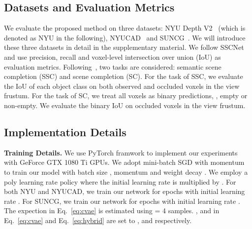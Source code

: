 \documentclass[10pt,twocolumn,letterpaper]{article}
\begin{document}
\subsection{Datasets and Evaluation Metrics}
We evaluate the proposed method on three datasets: NYU Depth V2~\cite{nyudv2} (which is denoted as NYU in the following), NYUCAD~\cite{firman2016structured} and SUNCG~\cite{song2017semantic-sscnet}. We will introduce these three datasets in detail in the supplementary material. We follow SSCNet~\cite{song2017semantic-sscnet} and use precision, recall and voxel-level intersection over union (IoU) as evaluation metrics. Following~\cite{song2017semantic-sscnet}, two tasks are considered: semantic scene completion (SSC) and scene completion (SC). For the task of SSC, we evaluate the IoU of each object class on both observed and occluded voxels in the view frustum. For the task of SC, we treat all voxels as binary predictions, , empty or non-empty. We evaluate the binary IoU on occluded voxels in the view frustum.

\subsection{Implementation Details}

\noindent \textbf{Training Details.} We use PyTorch framwork to implement our experiments with  GeForce GTX 1080 Ti GPUs. We adopt mini-batch SGD with momentum to train our model with batch size , momentum  and weight decay . We employ a poly learning rate policy where the initial learning rate is multiplied by . For both NYU and NYUCAD, we train our network for  epochs with initial learning rate . For SUNCG, we train our network for  epochs with initial learning rate . The expection in Eq.~\eqref{eq:cvae} is estimated using  = 4 samples. ,  and  in Eq.~\eqref{eq:cvae} and Eq.~\eqref{eq:hybrid} are set to ,  and  respectively.
\end{document}
